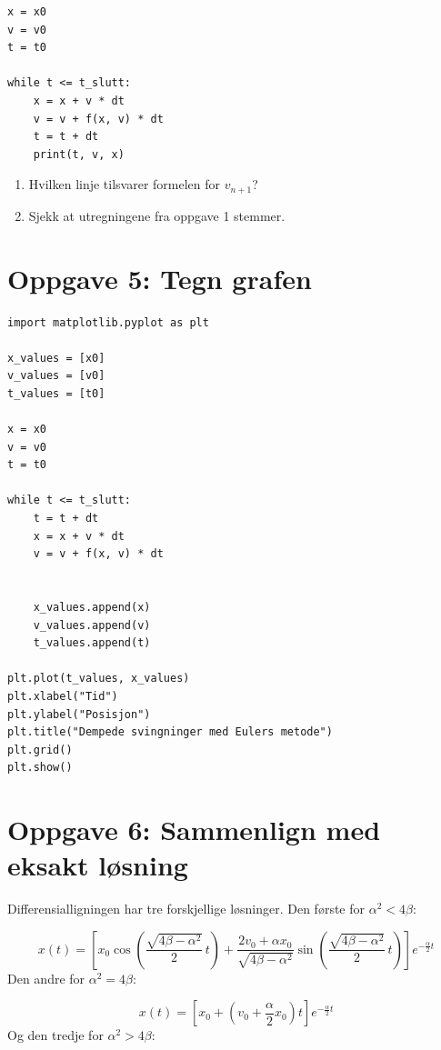 \documentclass[a4paper,12pt]{article}
\begin{document}
\begin{lstlisting}
x = x0
v = v0
t = t0

while t <= t_slutt:
    x = x + v * dt
    v = v + f(x, v) * dt
    t = t + dt
    print(t, v, x)
\end{lstlisting}

\begin{enumerate}[label=\alph*)]
\item Hvilken linje tilsvarer formelen for $v_{n+1}$?
\item Sjekk at utregningene fra oppgave 1 stemmer.
\end{enumerate}

\section*{Oppgave 5: Tegn grafen}

\begin{lstlisting}
import matplotlib.pyplot as plt

x_values = [x0]
v_values = [v0]
t_values = [t0]

x = x0
v = v0
t = t0

while t <= t_slutt:
	t = t + dt
    x = x + v * dt
    v = v + f(x, v) * dt
    
    
    x_values.append(x)
    v_values.append(v)
    t_values.append(t)

plt.plot(t_values, x_values)
plt.xlabel("Tid")
plt.ylabel("Posisjon")
plt.title("Dempede svingninger med Eulers metode")
plt.grid()
plt.show()
\end{lstlisting}

\section*{Oppgave 6: Sammenlign med eksakt løsning}
Differensialligningen har tre forskjellige løsninger. Den første for $\alpha^2 < 4\beta$:

\begin{equation}
x(t)=
\left[
x_0\cos\!\left(\frac{\sqrt{4\beta-\alpha^2}}{2}\,t\right) +
\frac{2v_0+\alpha x_0}{\sqrt{4\beta-\alpha^2}}
\sin\!\left(\frac{\sqrt{4\beta-\alpha^2}}{2}\,t\right)
\right] e^{-\frac{\alpha}{2}t}
\end{equation}
Den andre for $\alpha^2 = 4 \beta$:

\begin{equation}
x(t)=
\left[
x_0+\left(v_0+\frac{\alpha}{2}x_0\right)t
\right]
e^{-\frac{\alpha}{2}t}
\end{equation}
Og den tredje for $\alpha^2 > 4 \beta$:
\end{document}
